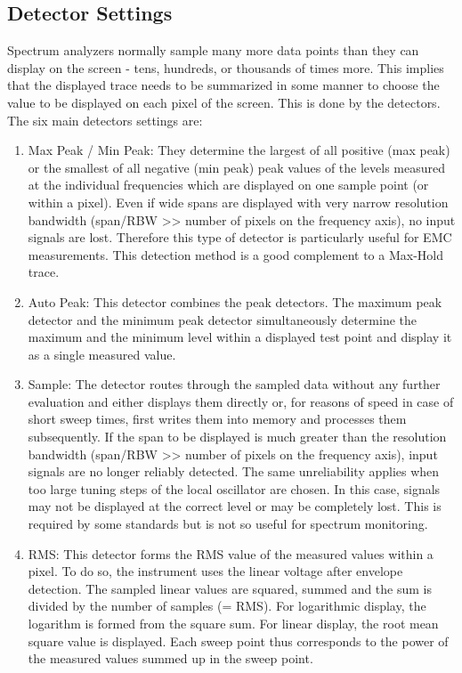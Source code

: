 \subsection{Detector Settings}
Spectrum analyzers normally sample many more data points than they can display on the screen - tens, hundreds, or thousands of times more. This implies that the displayed trace needs to be summarized in some manner to choose the value to be displayed on each pixel of the screen. This is done by the detectors. The six main detectors settings are:
\begin{enumerate}
  \item Max Peak / Min Peak: They determine the largest of all positive (max peak) or the smallest of all negative (min peak) peak values of the levels measured at the individual frequencies which are displayed on one sample point (or within a pixel). Even if wide spans are displayed with very narrow resolution bandwidth (span/\acs{RBW} >> number of pixels on the frequency axis), no input signals are lost. Therefore this type of detector is particularly useful for \acs{EMC} measurements. This detection method is a good complement to a Max-Hold trace.
  \item Auto Peak: This detector combines the peak detectors. The maximum peak detector and the minimum peak detector simultaneously determine the maximum and the minimum level within a displayed test point and display it as a single measured value. 
  \item Sample: The detector routes through the sampled data without any further evaluation and either displays them directly or, for reasons of speed in case of short sweep times, first writes them into memory and processes them subsequently. If the span to be displayed is much greater than the resolution bandwidth (span/\acs{RBW} >> number of pixels on the frequency axis), input signals are no longer reliably detected. The same unreliability applies when too large tuning steps of the local oscillator are chosen. In this case, signals may not be displayed at the correct level or may be completely lost. This is required by some standards but is not so useful for spectrum monitoring. 
  \item \ac{RMS}: This detector forms the \acs{RMS} value of the measured values within a pixel. To do so, the instrument uses the linear voltage after envelope detection. The sampled linear values are squared, summed and the sum is divided by the number of samples (= \acs{RMS}). For logarithmic display, the logarithm is formed from the square sum. For linear display, the root mean square value is displayed. Each sweep point thus corresponds to the power of the measured values summed up in the sweep point. 

\end{enumerate}
